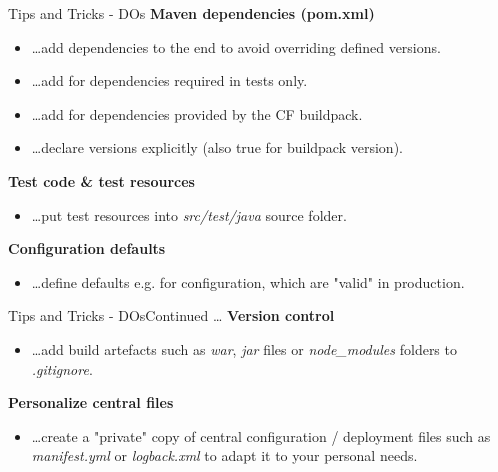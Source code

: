 \begin{frame}{Tips and Tricks - DOs}
\small
\textbf{Maven dependencies (pom.xml)}
\begin{itemize}
\item \ldots add dependencies to the end to avoid overriding defined versions.
\item \ldots add  for dependencies required in tests only.
\item \ldots add  for dependencies provided by the CF buildpack.
\item \ldots declare versions explicitly (also true for buildpack version).
\end{itemize}
\textbf{Test code \& test resources}
\begin{itemize}
\item \ldots put test resources into \emph{src/test/java} source folder.
\end{itemize}
\textbf{Configuration defaults}
\begin{itemize}
\item \ldots define defaults e.g. for configuration, which are "valid" in production.
\end{itemize}
\end{frame}

\begin{frame}{Tips and Tricks - DOs}{Continued \ldots}
\small
\textbf{Version control}
\begin{itemize}
\item \ldots add build artefacts such as \emph{war}, \emph{jar} files or \emph{node\_modules} folders to \emph{.gitignore}.
\end{itemize}
\textbf{Personalize central files}
\begin{itemize}
\item \ldots create a "private" copy of central configuration / deployment files such as \emph{manifest.yml} or \emph{logback.xml} to adapt it to your personal needs. 
\end{itemize}
\vfill
\end{frame}
